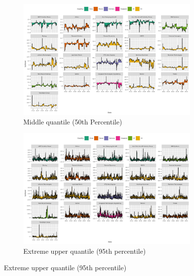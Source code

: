 \documentclass[
  letterpaper,
  DIV=11,
  numbers=noendperiod]{scrartcl}
\begin{document}
\begin{figure}

{\centering 

\begin{figure}[H]

{\centering \includegraphics[width=6.75in,height=\textheight]{plots/fig-volnet50.png}

}

\caption{Middle quantile (50th Percentile)}

\end{figure}

\begin{figure}[H]

{\centering \includegraphics[width=6.75in,height=\textheight]{plots/fig-volnet95.png}

}

\caption{Extreme upper quantile (95th percentile)}


\end{figure}}
\end{figure}
\end{document}
